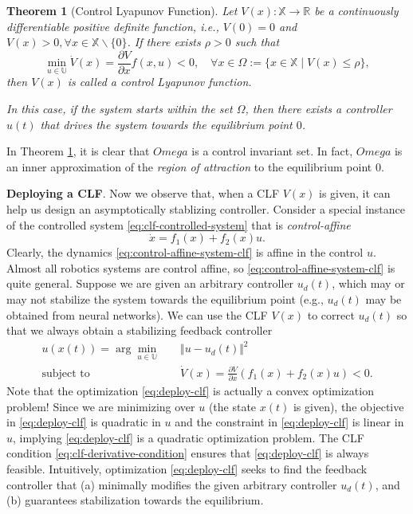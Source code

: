 \documentclass[
]{book}
\newtheorem{theorem}{Theorem}[chapter]
\theoremstyle{definition}
\theoremstyle{definition}
\theoremstyle{definition}
\theoremstyle{definition}
\theoremstyle{remark}
\begin{document}
\begin{theorem}[Control Lyapunov Function]
\protect\hypertarget{thm:control-lyapunov}{}\label{thm:control-lyapunov}Let \(V(x): \mathbb{X} \rightarrow \mathbb{R}\) be a continuously differentiable positive definite function, i.e., \(V(0) = 0\) and \(V(x) > 0, \forall x \in \mathbb{X} \backslash \{ 0 \}\). If there exists \(\rho > 0\) such that
\begin{equation}
\min_{u \in \mathbb{U}} \dot{V}(x) = \frac{\partial V}{\partial x} f(x,u) < 0, \quad \forall x \in \Omega := \{ x \in \mathbb{X} \mid V(x) \leq \rho \},
\label{eq:clf-derivative-condition}
\end{equation}
then \(V(x)\) is called a control Lyapunov function.

In this case, if the system starts within the set \(\Omega\), then there exists a controller \(u(t)\) that drives the system towards the equilibrium point \(0\).
\end{theorem}

In Theorem \ref{thm:control-lyapunov}, it is clear that \(Omega\) is a control invariant set. In fact, \(Omega\) is an inner approximation of the \emph{region of attraction} to the equilibrium point \(0\).

\textbf{Deploying a CLF}. Now we observe that, when a CLF \(V(x)\) is given, it can help us design an asymptotically stablizing controller. Consider a special instance of the controlled system \eqref{eq:clf-controlled-system} that is \emph{control-affine}
\begin{equation}
\dot{x} = f_1(x) + f_2(x)u.
\label{eq:control-affine-system-clf}
\end{equation}
Clearly, the dynamics \eqref{eq:control-affine-system-clf} is affine in the control \(u\). Almost all robotics systems are control affine, so \eqref{eq:control-affine-system-clf} is quite general. Suppose we are given an arbitrary controller \(u_d(t)\), which may or may not stabilize the system towards the equilibrium point (e.g., \(u_d(t)\) may be obtained from neural networks). We can use the CLF \(V(x)\) to correct \(u_d(t)\) so that we always obtain a stabilizing feedback controller
\begin{equation}
\begin{split}
u(x(t)) = \arg\min_{u \in \mathbb{U}} & \quad \Vert u - u_d(t) \Vert^2 \\
\text{subject to} & \quad \dot{V}(x) = \frac{\partial V}{\partial x} (f_1(x) + f_2(x) u) < 0.
\end{split}
\label{eq:deploy-clf}
\end{equation}
Note that the optimization \eqref{eq:deploy-clf} is actually a convex optimization problem! Since we are minimizing over \(u\) (the state \(x(t)\) is given), the objective in \eqref{eq:deploy-clf} is quadratic in \(u\) and the constraint in \eqref{eq:deploy-clf} is linear in \(u\), implying \eqref{eq:deploy-clf} is a quadratic optimization problem. The CLF condition \eqref{eq:clf-derivative-condition} ensures that \eqref{eq:deploy-clf} is always feasible. Intuitively, optimization \eqref{eq:deploy-clf} seeks to find the feedback controller that (a) minimally modifies the given arbitrary controller \(u_d(t)\), and (b) guarantees stabilization towards the equilibrium.
\end{document}
